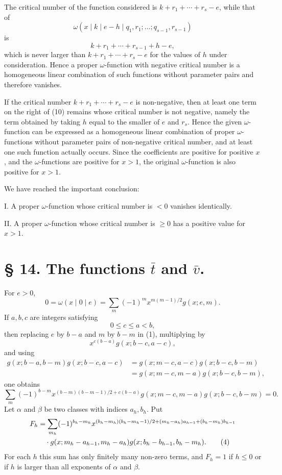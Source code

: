 \documentclass[11pt,a4paper]{article}
\begin{document}
The critical number of the function considered is $k+r_1+\cdots+r_s-e$, while that of
\[
 \omega(x\mid k\mid e-h\mid q_1,r_1;\ldots;q_{s-1},r_{s-1})
\]
is
\[
 k+r_1+\cdots+r_{s-1}+h-e,
\]
which is never larger than $k+r_1+\cdots+r_s-e$ for the values of $h$ under consideration. Hence a proper $\omega$-function with negative critical number is a homogeneous linear combination of such functions without parameter pairs and therefore vanishes.

If the critical number $k+r_1+\cdots+r_s-e$ is non-negative, then at least one term on the right of (10) remains whose critical number is not negative, namely the term obtained by taking $h$ equal to the smaller of $e$ and $r_s$. Hence the given $\omega$-function can be expressed as a homogeneous linear combination of proper $\omega$-functions without parameter pairs of non-negative critical number, and at least one such function actually occurs. Since the coefficients are positive for positive $x$, and the $\omega$-functions are positive for $x>1$, the original $\omega$-function is also positive for $x>1$.

We have reached the important conclusion:

I. A proper $\omega$-function whose critical number is $<0$ vanishes identically.

II. A proper $\omega$-function whose critical number is $\ge0$ has a positive value for $x>1$.

\section*{§ 14. The functions $\bar t$ and $\bar v$.}

For $e>0$,
\begin{equation}
 0=\omega(x\mid0\mid e)=\sum_m(-1)^m x^{m(m-1)/2}g(x;e,m).
\tag{1}
\end{equation}
If $a,b,c$ are integers satisfying
\begin{equation}
 0\le c\le a<b,
\tag{2}
\end{equation}
then replacing $e$ by $b-a$ and $m$ by $b-m$ in (1), multiplying by
\[
 x^{c(b-a)}g(x;b-c,a-c),
\]
and using
\begin{align*}
 g(x;b-a,b-m)g(x;b-c,a-c)
 &=g(x;m-c,a-c)g(x;b-c,b-m)\\
 &=g(x;m-c,m-a)g(x;b-c,b-m),
\end{align*}
one obtains
\begin{equation}
 \sum_m(-1)^{b-m}x^{(b-m)(b-m-1)/2+c(b-a)}
 g(x;m-c,m-a)g(x;b-c,b-m)=0.
\tag{3}
\end{equation}
Let $\alpha$ and $\beta$ be two classes with indices $a_h,b_h$. Put
\begin{align}
F_h&=\sum_{m_h}(-1)^{b_h-m_h}
 x^{(b_h-m_h)(b_h-m_h-1)/2+(m_h-a_h)a_{h-1}+(b_h-m_h)b_{h-1}}\notag\\
&\quad\cdot g(x;m_h-a_{h-1},m_h-a_h)g(x;b_h-b_{h-1},b_h-m_h).
\tag{4}
\end{align}
For each $h$ this sum has only finitely many non-zero terms, and $F_h=1$ if $h\le0$ or if $h$ is larger than all exponents of $\alpha$ and $\beta$.
\end{document}

